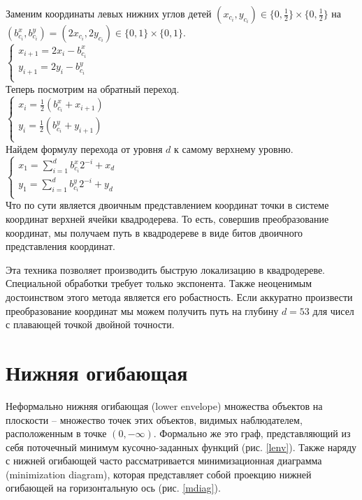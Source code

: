 Заменим координаты левых нижних углов детей $(x_{c_i}, y_{c_i}) \in \{0, \frac{1}{2}\} \times \{0, \frac{1}{2}\}$
на $(b^x_{c_i}, b^y_{c_i}) = (2x_{c_i}, 2y_{c_i}) \in \{0, 1\} \times \{0, 1\}$.\\
$
\left\{
\begin{array}{l}
x_{i+1} = 2x_i - b^x_{c_i}  \\
y_{i+1} = 2y_i - b^y_{c_i}  \\
\end{array}
\right.$
\\
Теперь посмотрим на обратный переход.\\
$
\left\{
\begin{array}{l}
x_i = \frac{1}{2}(b^x_{c_i} + x_{i+1})  \\
y_i = \frac{1}{2}(b^y_{c_i} + y_{i+1})  \\
\end{array}
\right.$
\\
Найдем формулу перехода от уровня $d$ к самому верхнему уровню.\\
$
\left\{
\begin{array}{l}
x_1 = \sum\limits_{i=1}^db^x_{c_i}2^{-i} + x_d  \\
y_1 = \sum\limits_{i=1}^db^y_{c_i}2^{-i} + y_d  \\
\end{array}
\right.$
\\
Что по сути является двоичным представлением координат точки в системе координат верхней ячейки квадродерева.
То есть, совершив преобразование координат, мы получаем путь в квадродереве в виде битов
двоичного представления координат.

Эта техника позволяет производить быструю локализацию в квадродереве. 
Специальной обработки требует только экспонента. Также неоценимым достоинством этого метода
является его робастность. Если аккуратно произвести преобразование координат мы можем
получить путь на глубину $d = 53$ для чисел с плавающей точкой двойной точности.

\FloatBarrier
\section{Нижняя огибающая}
Неформально нижняя огибающая (lower envelope) множества объектов на плоскости –
множество точек этих объектов, видимых наблюдателем, расположенным в
точке $(0, -\infty)$. Формально же это граф, представляющий из себя поточечный
минимум кусочно-заданных функций \cite{LENV} (рис. \ref{lenv}).
Также наряду с нижней огибающей часто рассматривается минимизационная диаграмма
(minimization diagram), которая представляет собой проекцию нижней огибающей на
горизонтальную ось (рис. \ref{mdiag}). 

